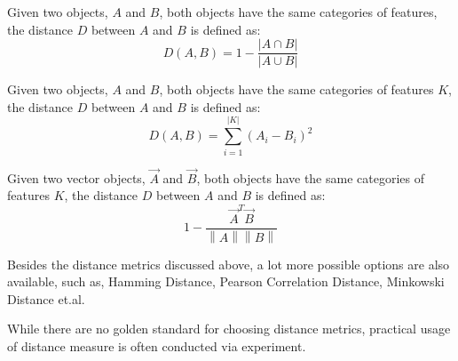 \documentclass[utf8,english]{gradu3}
\begin{document}

\begin{definition}
	\label{def:jaccard_distance}
	Given two objects, $A$ and $B$, both objects have the same categories of features, the distance $D$ between $A$ and $B$ is defined as:
	\[
	D\left(A,B\right) = 1 - 
	\frac{
		\lvert A \cap B \lvert
	}{
		\lvert A \cup B \lvert
	}
\]
\end{definition}

\begin{definition}
	\label{def:euclidean_distance}
	Given two objects, $A$ and $B$, both objects have the same categories of features $K$, the distance $D$ between $A$ and $B$ is defined as:
	\[
	D\left(A,B\right) =
	\sum\limits_{i=1}^{\lvert  K\rvert } \left( 
		A_i - B_i
		\right)^2
\]
\end{definition}

\begin{definition}
	\label{def:cosine_distance}
	Given two vector objects, $ \overrightarrow{A}$ and $\overrightarrow{B}$, both objects have the same categories of features $K$, the distance $D$ between $A$ and $B$ is defined as:
	\[
	1- \frac{ \overrightarrow{A}^T \overrightarrow{B} }{\left \| A \right \| \left \| B \right \|}
	\]
\end{definition}



Besides the distance metrics discussed above, a lot more possible options are also available, such as, Hamming Distance, Pearson Correlation Distance, Minkowski Distance et.al. 

While there are no golden standard for choosing distance metrics, practical usage of distance measure is often conducted via experiment.
\end{document}
